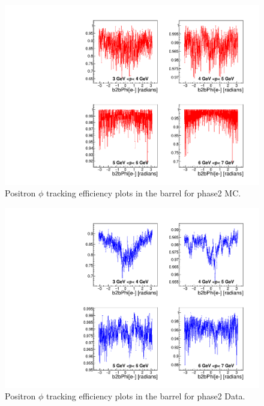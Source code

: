 \documentclass[a4paper,11pt,twosided,final,german,openbib,pdftex,listof=totoc,bibliography=totoc]{scrbook}
\begin{document}
\begin{appendix}
\begin{figure}[!htbp]
	\centering
	\includegraphics[width=\textwidth]{Plots/master/xPMPhiepBarrel_MC}
	\caption[Momentum $\phi$ Positron Barrel Efficiency Phase2 MC]{Positron $\phi$ tracking efficiency plots in the barrel for phase2 MC.}
	\label{plt:PMPhiepBarrel_MC}
\end{figure}


\begin{figure}[!htbp]
	\centering
	\includegraphics[width=\textwidth]{Plots/master/xPMPhiepBarrel_Data}
	\caption[Momentum $\phi$ Positron Barrel Efficiency Phase2 Data]{Positron $\phi$ tracking efficiency plots in the barrel for phase2 Data.}
	\label{plt:PMPhiepBarrel_Data}
\end{figure}




\end{appendix}
\end{document}
